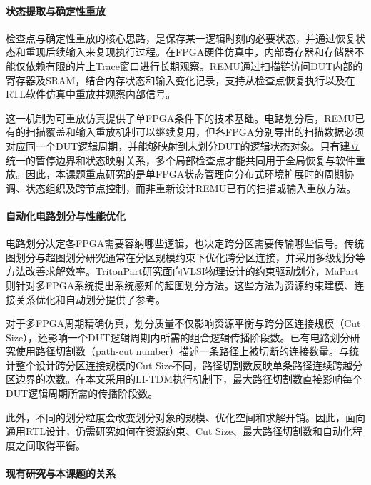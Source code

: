\paragraph{状态提取与确定性重放}

检查点与确定性重放的核心思路，是保存某一逻辑时刻的必要状态，并通过恢复状态和重现后续输入来复现执行过程。在FPGA硬件仿真中，内部寄存器和存储器不能仅依赖有限的片上Trace窗口进行长期观察。REMU通过扫描链访问DUT内部的寄存器及SRAM，结合内存状态和输入变化记录，支持从检查点恢复执行以及在RTL软件仿真中重放并观察内部信号\cite{chen_remu_2023}。

这一机制为可重放仿真提供了单FPGA条件下的技术基础。电路划分后，REMU已有的扫描覆盖和输入重放机制可以继续复用，但各FPGA分别导出的扫描数据必须对应同一个DUT逻辑周期，并能够映射到未划分DUT的逻辑状态对象。只有建立统一的暂停边界和状态映射关系，多个局部检查点才能共同用于全局恢复与软件重放。因此，本课题重点研究的是单FPGA状态管理向分布式环境扩展时的周期协调、状态组织及跨节点控制，而非重新设计REMU已有的扫描或输入重放方法。

\paragraph{自动化电路划分与性能优化}

电路划分决定各FPGA需要容纳哪些逻辑，也决定跨分区需要传输哪些信号。传统图划分与超图划分研究通常在分区规模约束下优化跨分区连接，并采用多级划分等方法改善求解效率\cite{karypis_multilevel_1999}。TritonPart研究面向VLSI物理设计的约束驱动划分，MaPart则针对多FPGA系统提出系统感知的超图划分方法\cite{tritonpart_2023,li_mapart_2024}。这些方法为资源约束建模、连接关系优化和自动划分提供了参考。

对于多FPGA周期精确仿真，划分质量不仅影响资源平衡与跨分区连接规模（Cut Size），还影响一个DUT逻辑周期内所需的组合逻辑传播阶段数。已有电路划分研究使用路径切割数（path-cut number）描述一条路径上被切断的连接数量\cite{sait_evolutionary_2002}。与统计整个设计跨分区连接规模的Cut Size不同，路径切割数反映单条路径连续跨越分区边界的次数。在本文采用的LI-TDM执行机制下，最大路径切割数直接影响每个DUT逻辑周期所需的传播阶段数。

此外，不同的划分粒度会改变划分对象的规模、优化空间和求解开销。因此，面向通用RTL设计，仍需研究如何在资源约束、Cut Size、最大路径切割数和自动化程度之间取得平衡。

\paragraph{现有研究与本课题的关系}

